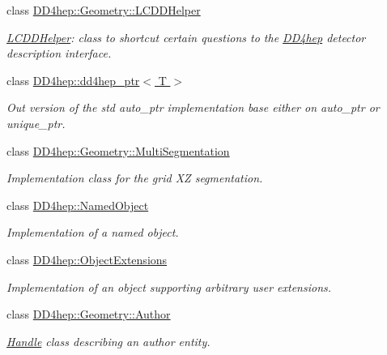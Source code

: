 \begin{DoxyCompactItemize}
class \hyperlink{class_d_d4hep_1_1_geometry_1_1_l_c_d_d_helper}{DD4hep::Geometry::LCDDHelper}
\begin{DoxyCompactList}\small\item\em \hyperlink{class_d_d4hep_1_1_geometry_1_1_l_c_d_d_helper}{LCDDHelper}: class to shortcut certain questions to the \hyperlink{namespace_d_d4hep}{DD4hep} detector description interface. \item\end{DoxyCompactList}\item 
class \hyperlink{class_d_d4hep_1_1dd4hep__ptr}{DD4hep::dd4hep\_\-ptr$<$ T $>$}
\begin{DoxyCompactList}\small\item\em Out version of the std auto\_\-ptr implementation base either on auto\_\-ptr or unique\_\-ptr. \item\end{DoxyCompactList}\item 
class \hyperlink{class_d_d4hep_1_1_geometry_1_1_multi_segmentation}{DD4hep::Geometry::MultiSegmentation}
\begin{DoxyCompactList}\small\item\em Implementation class for the grid XZ segmentation. \item\end{DoxyCompactList}\item 
class \hyperlink{class_d_d4hep_1_1_named_object}{DD4hep::NamedObject}
\begin{DoxyCompactList}\small\item\em Implementation of a named object. \item\end{DoxyCompactList}\item 
class \hyperlink{class_d_d4hep_1_1_object_extensions}{DD4hep::ObjectExtensions}
\begin{DoxyCompactList}\small\item\em Implementation of an object supporting arbitrary user extensions. \item\end{DoxyCompactList}\item 
class \hyperlink{class_d_d4hep_1_1_geometry_1_1_author}{DD4hep::Geometry::Author}
\begin{DoxyCompactList}\small\item\em \hyperlink{class_d_d4hep_1_1_handle}{Handle} class describing an author entity. \item\end{DoxyCompactList}\item 

\end{DoxyCompactItemize}
